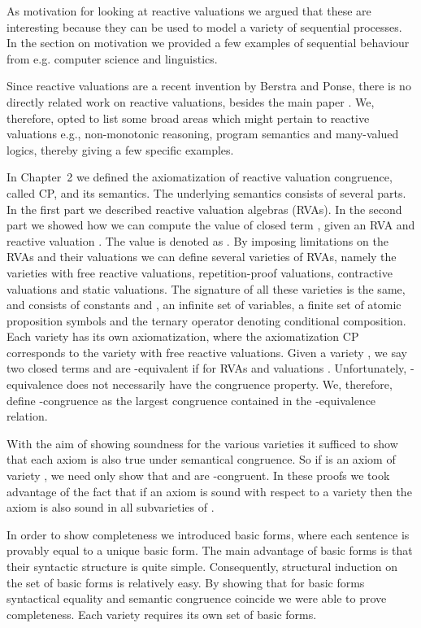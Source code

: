 \documentclass[a4paper,twoside,openright]{report}
\begin{document}
As motivation for looking at reactive valuations we argued that these are interesting because they can be used to model a variety of sequential processes. In the section on motivation we provided a few examples of sequential behaviour from e.g. computer science and linguistics.

Since reactive valuations are a recent invention by Berstra and Ponse, there is no directly related work on reactive valuations, besides the main paper \cite{main}. We, therefore, opted to list some broad areas which might pertain to reactive valuations e.g., non-monotonic reasoning, program semantics and many-valued logics, thereby giving a few specific examples. 

In Chapter~2 we defined the axiomatization of reactive valuation congruence, called CP, and its semantics. The underlying semantics consists of several parts. In the first part we described reactive valuation algebras (RVAs). In the second part we showed how we can compute the value of closed term , given an RVA  and reactive valuation . The value is denoted as . By imposing limitations on the RVAs and their valuations we can define several varieties of RVAs, namely the varieties with free reactive valuations, repetition-proof valuations, contractive valuations and static valuations. The signature of all these varieties is the same, and consists of constants  and , an infinite set of variables, a finite set of atomic proposition symbols and the ternary operator  denoting conditional composition. Each variety has its own axiomatization, where the axiomatization CP corresponds to the variety with free reactive valuations. Given a variety , we say two closed terms  and  are -equivalent if  for RVAs  and valuations . Unfortunately, -equivalence does not necessarily have the congruence property. We, therefore, define -congruence as the largest congruence contained in the -equivalence relation. 

With the aim of showing soundness for the various varieties it sufficed to show that each axiom is also true under semantical congruence. So if  is an axiom of variety , we need only show that  and  are -congruent. In these proofs we took advantage of the fact that if an axiom is sound with respect to a variety  then the axiom is also sound in all subvarieties of .

In order to show completeness we introduced basic forms, where each sentence is provably equal to a unique basic form. The main advantage of basic forms is that their syntactic structure is quite simple. Consequently, structural induction on the set of basic forms is relatively easy. By showing that for basic forms syntactical equality and semantic congruence coincide we were able to prove completeness. Each variety requires its own set of basic forms.
\end{document}

